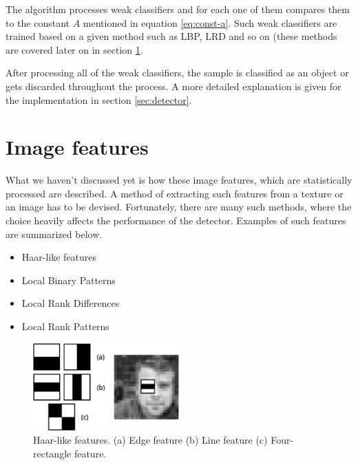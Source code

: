 The algorithm processes weak classifiers and for each one of them compares them to the constant $A$ mentioned in equation \ref{eq:const-a}. Such weak classifiers are trained based on a given method such as LBP, LRD and so on (these methods are covered later on in section \ref{sec:app-image-features}.

After processing all of the weak classifiers, the sample is classified as an object or gets discarded throughout the process. A more detailed explanation is given for the implementation in section \ref{sec:detector}.

\section{Image features}\label{sec:app-image-features}

What we haven't discussed yet is how these image features, which are statistically processed are described. A method of extracting such features from a texture or an image has to be devised. Fortunately, there are many such methods, where the choice heavily affects the performance of the detector. Examples of such features are summarized below.

\begin{itemize}
	\item Haar-like features \cite{Viola01rapidobject}
	\item Local Binary Patterns \cite{Ojala02multiresolutiongrayscale}
	\item Local Rank Differences \cite{herout2008impl}
	\item Local Rank Patterns \cite{Hradis08localrank}
\end{itemize}

\begin{center}
\begin{figure}[ht]
	\centering\includegraphics[width=0.5\textwidth]{fig/haar.eps}
	\caption{Haar-like features. (a) Edge feature (b) Line feature (c) Four-rectangle feature.}
	\label{fig:haar}
\end{figure}
\end{center}

